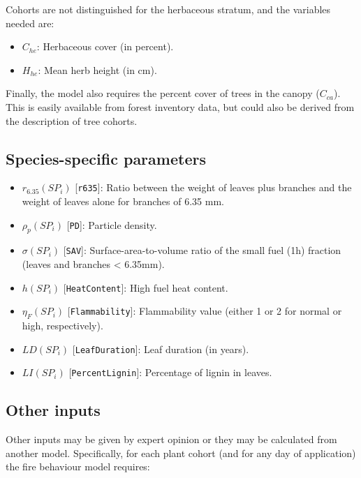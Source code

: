 \documentclass[]{book}
\providecommand{\tightlist}{%
  \setlength{\itemsep}{0pt}\setlength{\parskip}{0pt}}
\begin{document}
Cohorts are not distinguished for the herbaceous stratum, and the
variables needed are:

\begin{itemize}
\tightlist
\item
  \(C_{he}\): Herbaceous cover (in percent).
\item
  \(H_{he}\): Mean herb height (in cm).
\end{itemize}

Finally, the model also requires the percent cover of trees in the
canopy (\(C_{ca}\)). This is easily available from forest inventory
data, but could also be derived from the description of tree cohorts.

\subsection{Species-specific
parameters}\label{species-specific-parameters}

\begin{itemize}
\tightlist
\item
  \(r_{6.35}(SP_i)\) {[}\texttt{r635}{]}: Ratio between the weight of
  leaves plus branches and the weight of leaves alone for branches of
  6.35 mm.
\item
  \(\rho_p(SP_i)\) {[}\texttt{PD}{]}: Particle density.
\item
  \(\sigma(SP_i)\) {[}\texttt{SAV}{]}: Surface-area-to-volume ratio of
  the small fuel (1h) fraction (leaves and branches \textless{} 6.35mm).
\item
  \(h(SP_i)\) {[}\texttt{HeatContent}{]}: High fuel heat content.
\item
  \(\eta_{F}(SP_i)\) {[}\texttt{Flammability}{]}: Flammability value
  (either 1 or 2 for normal or high, respectively).
\item
  \(LD(SP_i)\) {[}\texttt{LeafDuration}{]}: Leaf duration (in years).
\item
  \(LI(SP_i)\) {[}\texttt{PercentLignin}{]}: Percentage of lignin in
  leaves.
\end{itemize}

\subsection{Other inputs}\label{other-inputs}

Other inputs may be given by expert opinion or they may be calculated
from another model. Specifically, for each plant cohort (and for any day
of application) the fire behaviour model requires:
\end{document}
